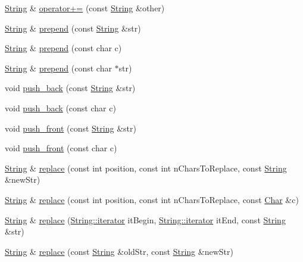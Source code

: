 \begin{DoxyCompactItemize}
\item 
\hyperlink{classprism_1_1_string}{String} \& \hyperlink{classprism_1_1_string_a8d509ab7982bc6176c58f5fbce1da15c}{operator+=} (const \hyperlink{classprism_1_1_string}{String} \&other)
\item 
\hyperlink{classprism_1_1_string}{String} \& \hyperlink{classprism_1_1_string_a0deb77daa45d88136d39b9960075cdb5}{prepend} (const \hyperlink{classprism_1_1_string}{String} \&str)
\item 
\hyperlink{classprism_1_1_string}{String} \& \hyperlink{classprism_1_1_string_a8f670c0ad0c7c00cdb89170f4b2275b3}{prepend} (const char c)
\item 
\hyperlink{classprism_1_1_string}{String} \& \hyperlink{classprism_1_1_string_a91f28e14e3febf379ff47a3bda12adab}{prepend} (const char $\ast$str)
\item 
void \hyperlink{classprism_1_1_string_a8e1459833ede719cd6b01ab5ce15d2e5}{push\+\_\+back} (const \hyperlink{classprism_1_1_string}{String} \&str)
\item 
void \hyperlink{classprism_1_1_string_a81b6a39be2a985ea02c46a4d1490755c}{push\+\_\+back} (const char c)
\item 
void \hyperlink{classprism_1_1_string_aadab394ea2370e2d23fcf932d373dcd3}{push\+\_\+front} (const \hyperlink{classprism_1_1_string}{String} \&str)
\item 
void \hyperlink{classprism_1_1_string_a5471ead67f8901cbed6bd43ef9f4a618}{push\+\_\+front} (const char c)
\item 
\hyperlink{classprism_1_1_string}{String} \& \hyperlink{classprism_1_1_string_a41e0509f93cfa38cd6df3f6965d6f143}{replace} (const int position, const int n\+Chars\+To\+Replace, const \hyperlink{classprism_1_1_string}{String} \&new\+Str)
\item 
\hyperlink{classprism_1_1_string}{String} \& \hyperlink{classprism_1_1_string_a4e8a35e0f084e4d382858e231bf5ed31}{replace} (const int position, const int n\+Chars\+To\+Replace, const \hyperlink{classprism_1_1_char}{Char} \&c)
\item 
\hyperlink{classprism_1_1_string}{String} \& \hyperlink{classprism_1_1_string_a0a8ad9ff92bb002dfb4c13625ad93d24}{replace} (\hyperlink{classprism_1_1_string_adacc7975837e5fff95d70690777fb330}{String\+::iterator} it\+Begin, \hyperlink{classprism_1_1_string_adacc7975837e5fff95d70690777fb330}{String\+::iterator} it\+End, const \hyperlink{classprism_1_1_string}{String} \&str)
\item 
\hyperlink{classprism_1_1_string}{String} \& \hyperlink{classprism_1_1_string_a81e268b27da75c013b41e400b2fcb2f1}{replace} (const \hyperlink{classprism_1_1_string}{String} \&old\+Str, const \hyperlink{classprism_1_1_string}{String} \&new\+Str)

\end{DoxyCompactItemize}
